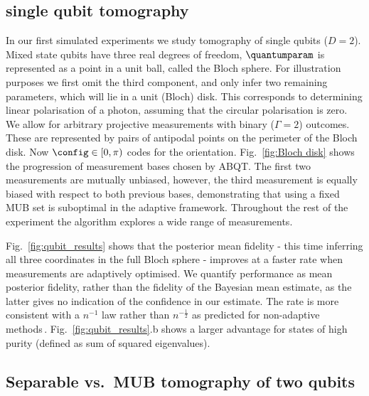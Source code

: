 \subsection{single qubit tomography}

In our first simulated experiments we study tomography of single qubits ($D=2$). Mixed state qubits have three real degrees of freedom, $\quantumparam$ is represented as a point in a unit ball, called the Bloch sphere. For illustration purposes we first omit the third component, and only infer two remaining parameters, which will lie in a unit (Bloch) disk. This corresponds to \eg determining linear polarisation of a photon, assuming that the circular polarisation is zero. We allow for arbitrary projective measurements with binary ($\Gamma = 2$) outcomes. These are represented by pairs of antipodal points on the perimeter of the Bloch disk. Now $\config\in[0,\pi)$ codes for the orientation. Fig.\ \ref{fig:Bloch disk} shows the progression of measurement bases chosen by ABQT. The first two measurements are mutually unbiased, however, the third measurement is equally biased with respect to both previous bases, demonstrating that using a fixed MUB set is suboptimal in the adaptive framework. Throughout the rest of the experiment the algorithm explores a wide range of measurements.

Fig.\ \ref{fig:qubit_results} shows that the posterior mean fidelity - this time inferring all three coordinates in the full Bloch sphere - improves at a faster rate when measurements are adaptively optimised. We quantify performance as mean posterior fidelity, rather than the fidelity of the Bayesian mean estimate, as the latter gives no indication of the confidence in our estimate. The rate is more consistent with a $n^{-1}$ law rather than $n^{-\frac{1}{2}}$ as predicted for non-adaptive methods\,\cite[][and refs.]{MUBExperiment}. Fig.\ \ref{fig:qubit_results}.b shows a larger advantage for states of high purity (defined as sum of squared eigenvalues).

\subsection{Separable vs.\ MUB tomography of two qubits}

